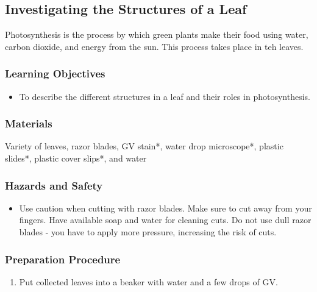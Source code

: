 \subsection{Investigating the Structures of a Leaf}

Photosynthesis is the process by which green plants make their food using water, carbon dioxide, and energy from the sun.  This process takes place in teh leaves. 

\subsubsection*{Learning Objectives}
\begin{itemize}
\item{To describe the different structures in a leaf and their roles in photosynthesis.}
\end{itemize}

\subsubsection*{Materials}
Variety of leaves, razor blades, GV stain*, water drop microscope*, plastic slides*, plastic cover slips*, and water

\subsubsection*{Hazards and Safety}
\begin{itemize}
\item{Use caution when cutting with razor blades. Make sure to cut away from your fingers. Have available soap and water for cleaning cuts. Do not use dull razor blades - you have to apply more pressure, increasing the risk of cuts.}
\end{itemize}

\subsubsection*{Preparation Procedure}
\begin{enumerate}
\item{Put collected leaves into a beaker with water and a few drops of GV.}
\end{enumerate}

